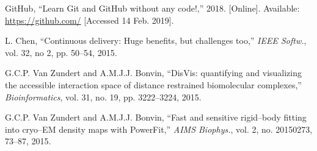 \begin{thebibliography}{1}
GitHub, ``Learn Git and GitHub without any code!,''
2018.
[Online]. Available: \url{https://github.com/}
[Accessed 14 Feb. 2019].

L. Chen,
``Continuous delivery: Huge benefits, but challenges too,''
\emph{IEEE Softw.},
vol. 32, no 2, pp. 50--54, 2015.



G.C.P. Van Zundert and A.M.J.J. Bonvin,
``DisVis: quantifying and visualizing the accessible interaction space of distance
restrained biomolecular complexes,''
\emph{Bioinformatics}, vol. 31, no. 19, pp. 3222--3224, 2015.


G.C.P. Van Zundert and A.M.J.J. Bonvin,
``Fast and sensitive rigid--body fitting into cryo--EM density maps with PowerFit,''
\emph{AIMS Biophys.}, vol. 2, no. 20150273, 73--87, 2015.

\end{thebibliography}

